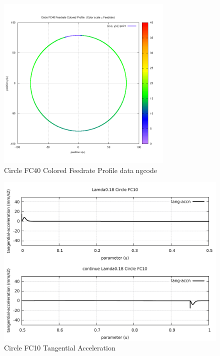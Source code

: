 \begin{figure}
	\caption     {Circle FC40 Colored Feedrate Profile data ngcode}
	\label{20-img-Circle-FC40-Colored-Feedrate-Profile-data_ngcode.png}
	\includegraphics[width=0.75\textwidth]{Chap4/appendix/app-Circle/plots/20-img-Circle-FC40-Colored-Feedrate-Profile-data_ngcode.png}
\end{figure}

\clearpage
\pagebreak

\begin{figure}
	\caption     {Circle FC10 Tangential Acceleration}
	\label{21-img-Circle-FC10-Tangential-Acceleration.pdf}
	\includegraphics[width=1.00\textwidth]{Chap4/appendix/app-Circle/plots/21-img-Circle-FC10-Tangential-Acceleration.pdf}
\end{figure}


